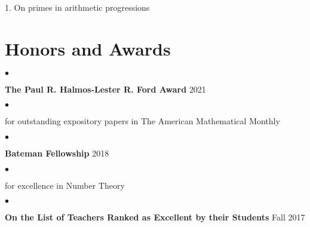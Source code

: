 \documentclass[margin,line,pifont,palatino,courier,10pt]{res}
\newenvironment{list1}{
  \begin{list}{$\bullet$}{%
      \setlength{\itemsep}{0in}
      \setlength{\parsep}{0in} \setlength{\parskip}{0in}
      \setlength{\topsep}{0in} \setlength{\partopsep}{0in}
      \setlength{\leftmargin}{0.17in}}}{\end{list}}
\begin{document}
\begin{resume}
1. {On primes in arithmetic progressions}




\section{\sc Honors and Awards}
\begin{list1}
	\item \textbf{The Paul R. Halmos-Lester R. Ford Award} \hfill{2021}
	
	\begin{list1}
		\item[]	for outstanding expository papers in The American Mathematical Monthly
	\end{list1}
\end{list1}


\begin{list1}
\item \textbf{Bateman Fellowship }  \hfill{2018}

\begin{list1}
	\item[]	for excellence in Number Theory
\end{list1}
\end{list1}

\begin{list1}
	\item \textbf{On the List of Teachers Ranked as Excellent by their Students} \hfill{Fall 2017}
\end{list1}







\end{resume}
\end{document}
